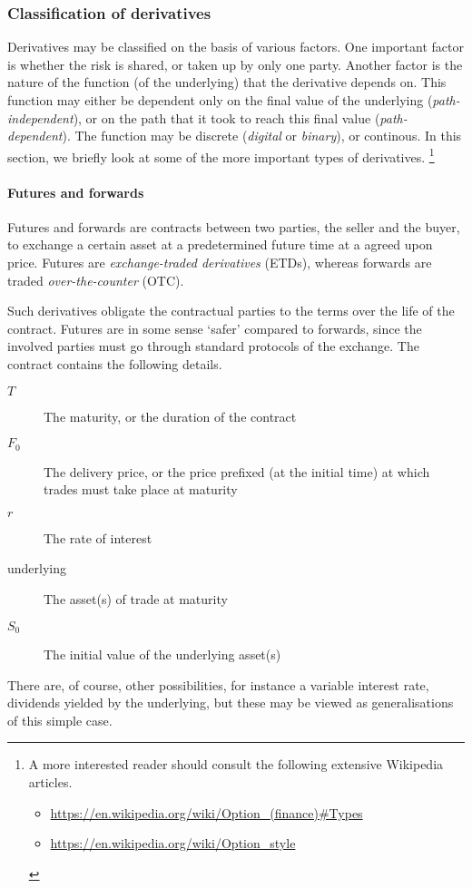 \subsubsection{Classification of derivatives}
\label{subsubsec:intro-derivative-classification}

Derivatives may be classified on the basis of various factors. One important factor is whether the risk is shared, or taken up by only one party. Another factor is the nature of the function (of the underlying) that the derivative depends on. This function may either be dependent only on the final value of the underlying (\emph{path-independent}), or on the path that it took to reach this final value (\emph{path-dependent}). The function may be discrete (\emph{digital} or \emph{binary}), or continous. In this section, we briefly look at some of the more important types of derivatives. \footnote{
	A more interested reader should consult the following extensive Wikipedia articles.
	\begin{itemize}
		\item \url{https://en.wikipedia.org/wiki/Option_(finance)\#Types}
		\item \url{https://en.wikipedia.org/wiki/Option_style}
	\end{itemize}
}


\paragraph{Futures and forwards}

\begin{dfn}
	Futures and forwards are contracts between two parties, the seller and the buyer, to exchange a certain asset at a predetermined future time at a agreed upon price. Futures are \emph{exchange-traded derivatives} (ETDs), whereas forwards are traded \emph{over-the-counter} (OTC).
\end{dfn}

Such derivatives obligate the contractual parties to the terms over the life of the contract. Futures are in some sense `safer' compared to forwards, since the involved parties must go through standard protocols of the exchange.
The contract contains the following details.
\begin{description}
	\item[$ T $] The maturity, or the duration of the contract
	\item[$ F_0 $] The delivery price, or the price prefixed (at the initial time) at which trades must take place at maturity
	\item[$ r $] The rate of interest
	\item[underlying] The asset(s) of trade at maturity
	\item[$ S_0 $] The initial value of the underlying asset(s)
\end{description}
There are, of course, other possibilities, for instance a variable interest rate, dividends yielded by the underlying, but these may be viewed as generalisations of this simple case.

